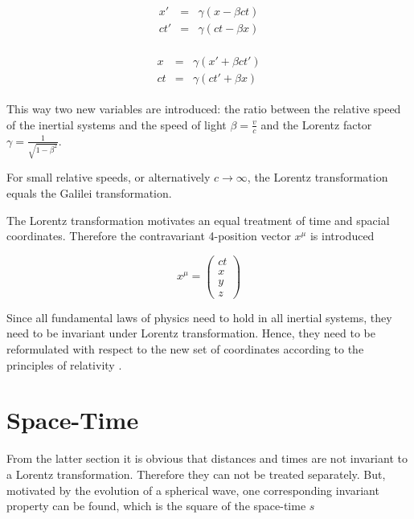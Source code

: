 \begin{eqnarray}\begin{array}{rcl}\label{lorentz1}
 x'  &=& \gamma\left(x-\beta ct\right)\\
 ct' &=& \gamma\left(ct-\beta x\right)
\end{array}\end{eqnarray}

\begin{eqnarray}\begin{array}{rcl}\label{lorentz2}
 x   &=& \gamma\left(x'+\beta ct'\right)\\
 ct  &=& \gamma\left(ct'+\beta x\right)
\end{array}\end{eqnarray}

This way two new variables are introduced: the ratio between the relative speed
of the inertial systems and the speed of light $\beta = \frac vc$ and the
Lorentz factor $\gamma = \frac 1{\sqrt{1-\beta^2}}$.

For small relative speeds, or alternatively $c\rightarrow\infty$, the Lorentz
transformation equals the Galilei transformation.

The Lorentz transformation motivates an equal treatment of time and spacial
coordinates. Therefore the contravariant 4-position vector $x^\mu$ is introduced

\begin{equation}
 x^\mu = \begin{pmatrix}
          ct \\ x \\ y \\ z
         \end{pmatrix}
\end{equation}

Since all fundamental laws of physics need to hold in all inertial systems,
they need to be invariant under Lorentz transformation. Hence, they need to be
reformulated with respect to the new set of coordinates according to
the principles of relativity \cite{einstein88}.


\section{Space-Time}
From the latter section it is obvious that distances and times are not
invariant to a Lorentz transformation. Therefore they can not be treated
separately. But, motivated by the evolution of a spherical wave, one corresponding
invariant property can be found, which is the square of the space-time $s$

